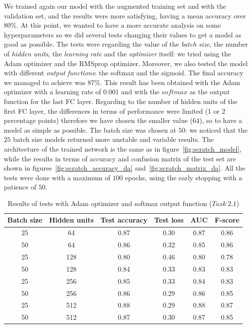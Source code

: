 \documentclass[11pt,a4paper,oneside]{article}
\begin{document}
We trained again our model with the augmented training set and with the validation set, and the results were more satisfying, having a mean accuracy over $80\%$. At this point, we wanted to have a more accurate analysis on some hyperparameters so we did several tests changing their values to get a model as good as possible. 
The tests were regarding the value of the \textit{batch size}, the number of \textit{hidden units}, the \textit{learning rate} and the \textit{optimizer} itself: we tried using the Adam optimizer and the RMSprop optimizer. Moreover, we also tested the model with different \textit{output functions}: the softmax and the sigmoid. 
The final accuracy we managed to achieve was $87\%$. This result has been obtained with the   Adam optimizer with a learning rate of $0.001$ and with the $softmax$ as the output function for the last FC layer. Regarding to the number of hidden units of the first FC layer, the differences in terms of performance were limited (1 or 2 percentage points) therefore we have chosen the smaller value ($64$), so to have a model as simple as possible. The batch size was chosen at $50$: we noticed that the $25$ batch size models returned more unstable and variable results. The architecture of the trained network is the same as in figure~\ref{fig:scratch_model}, while the results in terms of accuracy and confusion matrix of the test set are shown in figures~\ref{fig:scratch_accuracy_da} and~\ref{fig:scratch_matrix_da}.
All the tests were done with a maximum of $100$ epochs, using the early stopping with a patience of $50$.

\begin{table}[h]
\centering
\begin{tabular}{|cc|cccc|}
\hline
Batch size & Hidden units & Test accuracy & Test loss & AUC & F-score \\
\hline
25 & 64 & 0.87 & 0.30 & 0.87 & 0.86 \\ 
50 & 64 & 0.86 & 0.32 & 0.85 & 0.86 \\ 
25 & 128 & 0.80 & 0.46 & 0.80 & 0.78 \\ 
50 & 128 & 0.84 & 0.33 & 0.83 & 0.83 \\ 
25 & 256 & 0.85 & 0.33 & 0.84 & 0.83 \\ 
50 & 256 & 0.86 & 0.29 & 0.86 & 0.85 \\ 
25 & 512 & 0.88 & 0.29 & 0.88 & 0.87 \\ 
50 & 512 & 0.87 & 0.30 & 0.87 & 0.85 \\
\hline
\end{tabular}
\caption{Results of tests with Adam optimizer and softmax output function ($Task\ 2.1$)}
\end{table}
\end{document}
